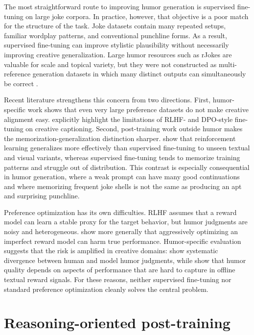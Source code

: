 The most straightforward route to improving humor generation is supervised fine-tuning on large joke corpora. In practice, however, that objective is a poor match for the structure of the task. Joke datasets contain many repeated setups, familiar wordplay patterns, and conventional punchline forms. As a result, supervised fine-tuning can improve stylistic plausibility without necessarily improving creative generalization. Large humor resources such as rJokes are valuable for scale and topical variety, but they were not constructed as multi-reference generation datasets in which many distinct outputs can simultaneously be correct \citep{weller2020rjokes}.

Recent literature strengthens this concern from two directions. First, humor-specific work shows that even very large preference datasets do not make creative alignment easy. \citet{Zhang2024HumorAI} explicitly highlight the limitations of RLHF- and DPO-style fine-tuning on creative captioning. Second, post-training work outside humor makes the memorization-generalization distinction sharper. \citet{Chu2025} show that reinforcement learning generalizes more effectively than supervised fine-tuning to unseen textual and visual variants, whereas supervised fine-tuning tends to memorize training patterns and struggle out of distribution. This contrast is especially consequential in humor generation, where a weak prompt can have many good continuations and where memorizing frequent joke shells is not the same as producing an apt and surprising punchline.

Preference optimization has its own difficulties. RLHF assumes that a reward model can learn a stable proxy for the target behavior, but humor judgments are noisy and heterogeneous. \citet{Gao2023} show more generally that aggressively optimizing an imperfect reward model can harm true performance. Humor-specific evaluation suggests that the risk is amplified in creative domains: \citet{Sakabe2025} show systematic divergence between human and model humor judgments, while \citet{winters2025evaluating} show that humor quality depends on aspects of performance that are hard to capture in offline textual reward signals. For these reasons, neither supervised fine-tuning nor standard preference optimization cleanly solves the central problem.

\section{Reasoning-oriented post-training}

